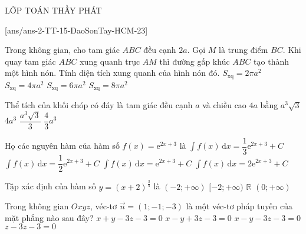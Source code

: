 \begin{name}
	{\tenchude}{\tendethi}{LỚP TOÁN THẦY PHÁT}{\thoigian}
\end{name}
\setcounter{ex}{0}\setcounter{bt}{0}
[ans/ans-2-TT-15-DaoSonTay-HCM-23]
\begin{ex}%
	Trong không gian, cho tam giác $ABC$ đều cạnh $2a$. Gọi $M$ là trung điểm $BC$. Khi quay tam giác $ABC$ xung quanh trục $AM$ thì đường gấp khúc $ABC$ tạo thành một hình nón. Tính diện tích xung quanh của hình nón đó.
	\choice
	{\True $S_{\text{xq}}=2\pi a^2$}
	{$S_{\text{xq}}=4\pi a^2$}
	{$S_{\text{xq}}=6\pi a^2$}
	{$S_{\text{xq}}=8\pi a^2$}
\end{ex}
\begin{ex}%
	Thể tích của khối chóp có đáy là tam giác đều cạnh $a$ và chiều cao $4a$ bằng
	\choice
	{$a^3\sqrt{3}$}
	{$4a^3$}
	{\True $\dfrac{a^3\sqrt{3}}{3}$}
	{$\dfrac{4}{3}a^3$}
\end{ex}
\begin{ex}%
	Họ các nguyên hàm của hàm số $f(x)=\mathrm{e}^{2x+3}$ là
	\choice
	{$\displaystyle\int f(x)\mathrm{\,d}x=\dfrac{1}{3}\mathrm{e}^{2x+3}+C$}
	{\True $\displaystyle\int f(x)\mathrm{\,d}x=\dfrac{1}{2}\mathrm{e}^{2x+3}+C$}
	{$\displaystyle\int f(x)\mathrm{\,d}x=\mathrm{e}^{2x+3}+C$}
	{$\displaystyle\int f(x)\mathrm{\,d}x=2\mathrm{e}^{2x+3}+C$}
\end{ex}
\begin{ex}%
	Tập xác định của hàm số $y=(x+2)^{\tfrac{3}{4}}$ là
	\choice
	{\True $(-2;+\infty)$}
	{$[-2;+\infty)$}
	{$\mathbb{R}$}
	{$(0;+\infty)$}
\end{ex}
\begin{ex}%
	Trong không gian $Oxyz$, véc-tơ $\vec{n}=(1;-1;-3)$ là một véc-tơ pháp tuyến của mặt phẳng nào sau đây?
	\choice
	{$x+y-3z-3=0$}
	{$x-y+3z-3=0$}
	{\True $x-y-3z-3=0$}
	{$z-3z-3=0$}
\end{ex}
